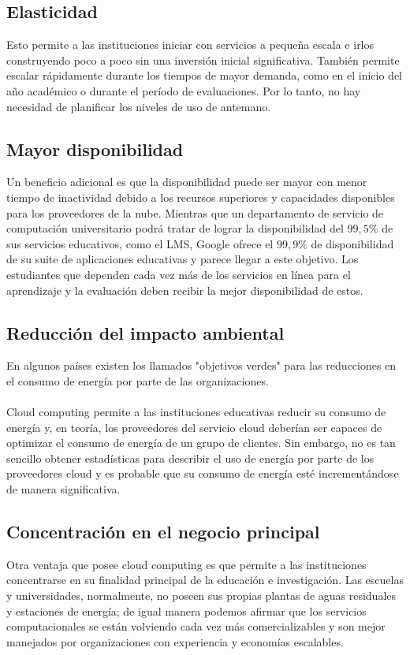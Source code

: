 \documentclass[journal]{IEEEtran}
\begin{document}
\subsection{Elasticidad}
Esto permite a las instituciones iniciar con servicios a pequeña escala e irlos construyendo poco a poco sin una inversión inicial significativa. También permite escalar rápidamente durante los tiempos de mayor demanda, como en el inicio del año académico o durante el período de evaluaciones. Por lo tanto, no hay necesidad de planificar los niveles de uso de antemano.
\subsection{Mayor disponibilidad}
Un beneficio adicional es que la disponibilidad puede ser mayor con menor tiempo de inactividad debido a los recursos superiores y capacidades disponibles para los proveedores de la nube. Mientras que un departamento de servicio de computación universitario podrá tratar de lograr la disponibilidad del $99,5\%$ de sus servicios educativos, como el LMS, Google ofrece el $99,9\%$ de disponibilidad de su suite de aplicaciones educativas y parece llegar a este objetivo. Los estudiantes que dependen cada vez más de los servicios en línea para el aprendizaje y la evaluación deben recibir la mejor disponibilidad de estos.
\subsection{Reducción del impacto ambiental}
En algunos países existen los llamados "objetivos verdes" para las reducciones en el consumo de energía por parte de las organizaciones.\\ \\
Cloud computing permite a las instituciones educativas reducir su consumo de energía y, en teoría, los proveedores del servicio cloud deberían ser capaces de optimizar el consumo de energía de un grupo de clientes. Sin embargo, no es tan sencillo obtener estadísticas para describir el uso de energía por parte de los proveedores cloud y es probable que su consumo de energía esté incrementándose de manera significativa.
\subsection{Concentración en el negocio principal}
Otra ventaja que posee cloud computing es que permite a las instituciones concentrarse en su finalidad principal de la educación e investigación. Las escuelas y universidades, normalmente, no poseen sus propias plantas de aguas residuales y estaciones de energía; de igual manera podemos afirmar que los servicios computacionales se están volviendo cada vez más comercializables y son mejor manejados por organizaciones con experiencia y economías escalables. 
\end{document}
